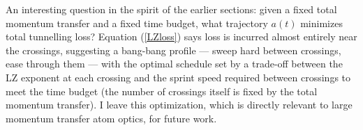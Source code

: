 An interesting question in the spirit of the earlier sections: given a fixed
total momentum transfer and a fixed time budget, what trajectory $a(t)$
minimizes total tunnelling loss?  Equation (\ref{LZloss}) says loss is incurred
almost entirely near the crossings, suggesting a bang-bang profile --- sweep
hard between crossings, ease through them --- with the optimal schedule set
by a trade-off between the LZ exponent at each crossing and the sprint speed
required between crossings to meet the time budget (the number of crossings
itself is fixed by the total momentum transfer).
I leave this optimization, which is directly relevant to large momentum
transfer atom optics, for future work.

